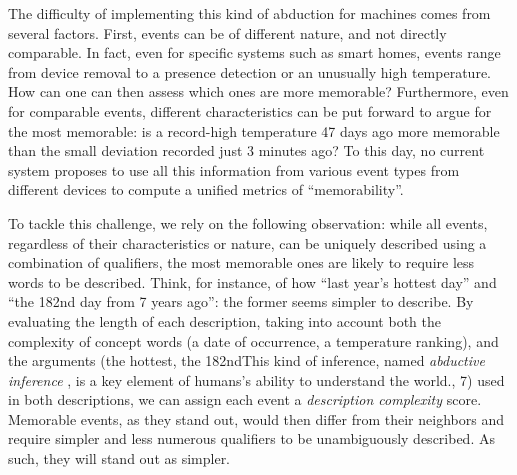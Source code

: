 \documentclass[conference]{IEEEtran}
\begin{document}
The difficulty of implementing this kind of abduction for machines comes from
several factors. First, events can be of different nature, and not directly
comparable. In fact, even for specific systems such as smart homes, events
range from device removal to a presence detection or an unusually high
temperature. How can one can then assess which ones are more memorable?
Furthermore, even for comparable events, different characteristics can be put
forward to argue for the most memorable: is a record-high temperature 47 days
ago more memorable than the small deviation recorded just 3 minutes ago? To
this day, no current system proposes to use all this information from various
event types from different devices to compute a unified metrics of
``memorability''.



To tackle this challenge, we rely on the following observation: while all
events, regardless of their characteristics or nature, can be uniquely
described using a combination of qualifiers, the most memorable ones are
likely to require less words to be described. Think, for instance, of how
``last year's hottest day'' and ``the 182nd day from 7 years ago'': the
former seems simpler to describe. By evaluating the length of each
description, taking into account both the complexity of concept words (a date
of occurrence, a temperature ranking), and the arguments (the hottest, the
182ndThis
kind of inference, named \emph{abductive inference} \cite
{magnani_abduction_2011}, is a key element of humans's ability to understand the world., 7) used in both descriptions, we can assign each event a \emph{description complexity}
score. Memorable events, as they stand out, would then differ from their
neighbors and require simpler and less numerous qualifiers to be
unambiguously described. As such, they will stand out as simpler.
\end{document}
